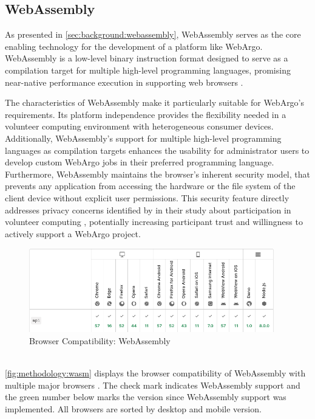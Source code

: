 \subsection{WebAssembly}
\label{sec:methodology:wasm}
As presented in \autoref{sec:background:webassembly}, WebAssembly serves as the core enabling technology for the development of a platform like WebArgo. WebAssembly is a low-level binary instruction format designed to serve as a compilation target for multiple high-level programming languages, promising near-native performance execution in supporting web browsers \cite{methodology:wasm, methodology:wasmW3C, methodology:wasm2}.

The characteristics of WebAssembly make it particularly suitable for WebArgo's requirements. Its platform independence provides the flexibility needed in a volunteer computing environment with heterogeneous consumer devices. Additionally, WebAssembly's support for multiple high-level programming languages as compilation targets enhances the usability for administrator users to develop custom WebArgo jobs in their preferred programming language. Furthermore, WebAssembly maintains the browser's inherent security model, that prevents any application from accessing the hardware or the file system of the client device without explicit user permissions. This security feature directly addresses privacy concerns identified by \citeauthor{intro:volunteerStudy} in their study about participation in volunteer computing \cite{intro:volunteerStudy}, potentially increasing participant trust and willingness to actively support a WebArgo project.

\begin{figure}[htbp]
  \centering
  \includegraphics[width=0.95\textwidth]{gfx/figures/webassembly-browsercompability.png}
  \caption{Browser Compatibility: WebAssembly \cite{methodology:wasmdocu}}
  \label{fig:methodology:wasm}
\end{figure}
~\\
\autoref{fig:methodology:wasm} displays the browser compatibility of WebAssembly with multiple major browsers \cite{methodology:wasmdocu}. The check mark indicates WebAssembly support and the green number below marks the version since WebAssembly support was implemented. All browsers are sorted by desktop and mobile version. 

